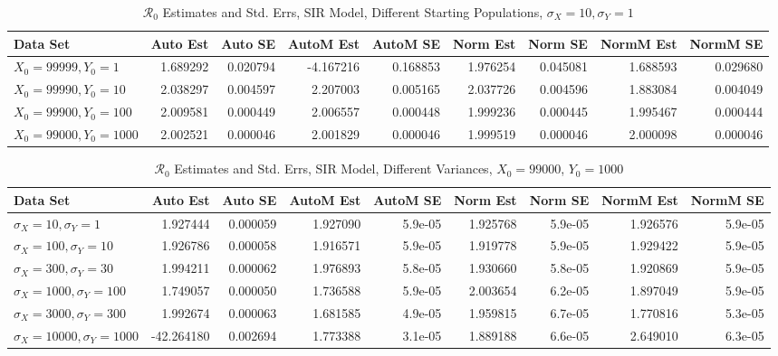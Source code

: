 \documentclass[12pt]{article}
\newcommand{\rr}{\ensuremath{\mathcal{R}_0}}
\begin{document}
\begin{table}[H]
	
	\caption{$\rr$ Estimates and Std. Errs, SIR Model,
		Different Starting Populations, 
		$\sigma_X = 10, \sigma_Y = 1$}
	\begin{footnotesize}
		\hskip -1.7cm
		\begin{tabular}{l|r|r|r|r|r|r|r|r}
			\hline
			Data Set & Auto Est & Auto SE & AutoM Est & AutoM SE & Norm Est & Norm SE & NormM Est & NormM SE\\
			\hline
			$X_0 = 99999, Y_0 = 1$ & 1.689292 & 0.020794 & -4.167216 & 0.168853 & 1.976254 & 0.045081 & 1.688593 & 0.029680\\
			\hline
			$X_0 = 99990, Y_0 = 10$ & 2.038297 & 0.004597 & 2.207003 & 0.005165 & 2.037726 & 0.004596 & 1.883084 & 0.004049\\
			\hline
			$X_0 = 99900, Y_0 = 100$ & 2.009581 & 0.000449 & 2.006557 & 0.000448 & 1.999236 & 0.000445 & 1.995467 & 0.000444\\
			\hline
			$X_0 = 99000, Y_0 = 1000$ & 2.002521 & 0.000046 & 2.001829 & 0.000046 & 1.999519 & 0.000046 & 2.000098 & 0.000046\\
			\hline
		\end{tabular}
	\end{footnotesize}
\end{table}

\begin{table}[H]
	
	\caption{$\rr$ Estimates and Std. Errs, SIR Model, 
		Different Variances, $X_0 = 99000$, $Y_0 = 1000$}
	\begin{footnotesize}
		\hskip -1.7cm
		\begin{tabular}{l|r|r|r|r|r|r|r|r}
			\hline
			Data Set & Auto Est & Auto SE & AutoM Est & AutoM SE & Norm Est & Norm SE & NormM Est & NormM SE\\
			\hline
			$\sigma_X = 10, \sigma_Y = 1$ & 1.927444 & 0.000059 & 1.927090 & 5.9e-05 & 1.925768 & 5.9e-05 & 1.926576 & 5.9e-05\\
			\hline
			$\sigma_X = 100, \sigma_Y = 10$ & 1.926786 & 0.000058 & 1.916571 & 5.9e-05 & 1.919778 & 5.9e-05 & 1.929422 & 5.9e-05\\
			\hline
			$\sigma_X = 300, \sigma_Y = 30$ & 1.994211 & 0.000062 & 1.976893 & 5.8e-05 & 1.930660 & 5.8e-05 & 1.920869 & 5.9e-05\\
			\hline
			$\sigma_X = 1000, \sigma_Y = 100$ & 1.749057 & 0.000050 & 1.736588 & 5.9e-05 & 2.003654 & 6.2e-05 & 1.897049 & 5.9e-05\\
			\hline
			$\sigma_X = 3000, \sigma_Y = 300$ & 1.992674 & 0.000063 & 1.681585 & 4.9e-05 & 1.959815 & 6.7e-05 & 1.770816 & 5.3e-05\\
			\hline
			$\sigma_X = 10000, \sigma_Y = 1000$ & -42.264180 & 0.002694 & 1.773388 & 3.1e-05 & 1.889188 & 6.6e-05 & 2.649010 & 6.3e-05\\
			\hline
		\end{tabular}
	\end{footnotesize}
\end{table}
\end{document}
